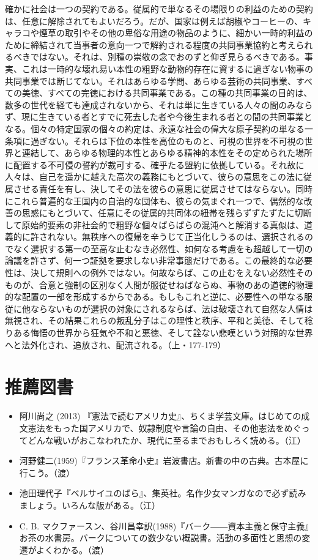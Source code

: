 確かに社会は一つの契約である。従属的で単なるその場限りの利益のための契約は、任意に解除されてもよいだろう。だが、国家は例えば胡椒やコーヒーの、キャラコや煙草の取引やその他の卑俗な用途の物品のように、細かい一時的利益のために締結されて当事者の意向一つで解約される程度の共同事業協約と考えられるべきではない。それは、別種の崇敬の念でおのずと仰ぎ見らるべきである。事実、これは一時的な壊れ易い本性の粗野な動物的存在に資するに過ぎない物事の共同事業では断じてない。それはあらゆる学問、あらゆる芸術の共同事業、すべての美徳、すべての完徳における共同事業である。この種の共同事業の目的は、数多の世代を経ても達成されないから、それは単に生きている人々の間のみならず、現に生きている者とすでに死去した者や今後生まれる者との間の共同事業となる。個々の特定国家の個々の約定は、永遠な社会の偉大な原子契約の単なる一条項に過ぎない。それらは下位の本性を高位のものと、可視の世界を不可視の世界と連結して、あらゆる物理的本性とあらゆる精神的本性をその定められた場所に配置する不可侵の誓約が裁可する、確乎たる盟約に依拠している。それ故に人々は、自己を遥かに越えた高次の義務にもとづいて、彼らの意思をこの法に従属させる責任を有し、決してその法を彼らの意思に従属させてはならない。同時にこれら普遍的な王国内の自治的な団体も、彼らの気まぐれ一つで、偶然的な改善の思惑にもとづいて、任意にその従属的共同体の紐帯を残らずずたずたに切断して原始的要素の非社会的で粗野な個々ばらばらの混沌へと解消する真似は、道義的に許されない。無秩序への復帰を辛うじて正当化しうるのは、選択されるのでなく選択する第一の至高な止むなき必然性、如何なる考慮をも超越して一切の論議を許さず、何一つ証拠を要求しない非常事態だけである。この最終的な必要性は、決して規則への例外ではない。何故ならば、この止むをえない必然性そのものが、合意と強制の区別なく人間が服従せねばならぬ、事物のあの道徳的物理的な配置の一部を形成するからである。もしもこれと逆に、必要性への単なる服従に他ならないものが選択の対象にされるならば、法は破壊されて自然な人情は無視され、その結果これらの叛乱分子はこの理性と秩序、平和と美徳、そして稔りある悔悟の世界から狂気や不和と悪徳、そして詮ない悲嘆という対照的な世界へと法外化され、追放され、配流される。（上・177-179）

\vspace{2zw}

\section{推薦図書}


\begin{itemize}
\item 阿川尚之 (2013) 『憲法で読むアメリカ史』、ちくま学芸文庫。はじめての成文憲法をもった国アメリカで、奴隷制度や言論の自由、その他憲法をめぐってどんな戦いがおこなわれたか、現代に至るまでおもしろく読める。（江）
\item 河野健二(1959)『フランス革命小史』岩波書店。新書の中の古典。古本屋に行こう。（渡）
\item 池田理代子『ベルサイユのばら』、集英社。名作少女マンガなので必ず読みましょう。いろんな版がある。（江）
\item C. B. マクファースン、谷川昌幸訳(1988)『バーク――資本主義と保守主義』お茶の水書房。バークについての数少ない概説書。活動の多面性と思想の変遷がよくわかる。（渡）

\end{itemize}

